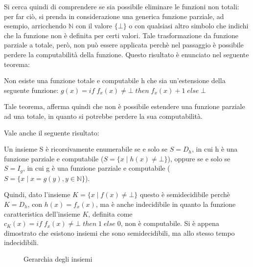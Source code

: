   Si cerca quindi di comprendere se sia possibile eliminare le funzioni non totali: per far ciò, si prenda in considerazione una generica funzione parziale, ad esempio, arricchendo \(\mathbb{N}\) con il valore \(\{\bot\}\) o con qualsiasi altro simbolo che indichi che la funzione non è definita per certi valori. Tale trasformazione da funzione parziale a totale, però, non può essere applicata perchè nel passaggio è possibile perdere la computabilità della funzione. Questo risultato è enunciato nel seguente teorema:
  
  \begin{theorem}
    Non esiste una funzione totale e computabile h che sia un'estensione della seguente funzione:
    \(g(x)=if\;f_x(x)\neq\bot\;then\;f_x(x)+1\;else\;\bot\)
  \end{theorem}

  Tale teorema, afferma quindi che non è possibile estendere una funzione parziale ad una totale, in quanto si potrebbe perdere la sua computabilità.

  Vale anche il seguente risultato:
  \begin{theorem}
    Un insieme S è ricorsivamente enumerabile se e solo se \(S=D_h\), in cui h è una funzione parziale e computabile (\(S=\{x\;|\;h(x)\neq \bot\}\)), oppure se e solo se \(S=I_g\), in cui g è una funzione parziale e computabile (\(S=\{x\;|\;x=g(y), y\in \mathbb{N}\}\)).
  \end{theorem}

  Quindi, dato l'insieme \(K=\{x\;|\;f(x) \neq \bot\}\) questo è semidecidibile perchè \(K=D_h\), con \(h(x)=f_x(x)\), ma è anche indecidibile in quanto la funzione caratteristica dell'insieme \(K\), definita come \(c_K(x)=if\;f_x(x)\neq \bot\;then\;1\;else\;0\), non è computabile. Si è appena dimostrato che esistono insiemi che sono semidecidibili, ma allo stesso tempo indecidibili.

  \begin{figure}[!h]
    \begin{center}    
    \end{center}
    \caption{Gerarchia degli insiemi}    
  \end{figure}

